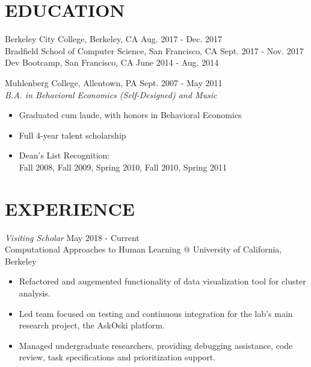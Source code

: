 \documentclass[margin, 10pt]{res} %
\begin{document}
\begin{resume}


\section{\small\bf EDUCATION}
Berkeley City College, Berkeley, CA \hfill Aug. 2017 - Dec. 2017 \\
Bradfield School of Computer Science, San Francisco, CA \hfill Sept. 2017 - Nov. 2017 \\
Dev Bootcamp, San Francisco, CA \hfill June 2014 - Aug. 2014

Muhlenberg College, Allentown, PA \hfill Sept. 2007 - May 2011 \\
{\sl B.A. in Behavioral Economics (Self-Designed) and Music}
\begin{itemize} \itemsep -2pt %
\item Graduated cum laude, with honors in Behavioral Economics
\item Full 4-year talent scholarship
\item Dean’s List Recognition: \\
Fall 2008, Fall 2009, Spring 2010, Fall 2010, Spring 2011
\end{itemize}



\section{\small\bf EXPERIENCE}

{\sl Visiting Scholar} \hfill May 2018 - Current \\
Computational Approaches to Human Learning @ University of California, Berkeley
\begin{itemize} \itemsep -2pt %
\item Refactored and augemented functionality of data visualization tool for cluster analysis.
\item Led team focused on testing and continuous integration for the lab's main research project, the AskOski platform.
\item Managed undergraduate researchers, providing debugging assistance, code review, task specifications and prioritization support.
\end{itemize}


\end{resume}
\end{document}
